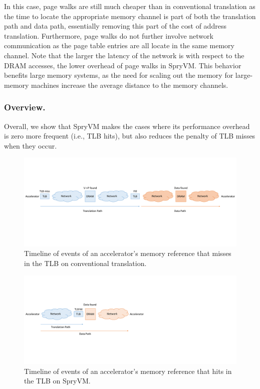 In this case, page walks are still much cheaper than in conventional translation as the time to locate the appropriate memory channel is part of both the translation path and data path, essentially removing this part of the cost of address translation. Furthermore, page walks do not further involve network communication as the page table entries are all locate in the same memory channel. Note that the larger the latency of the network is with respect to the DRAM accesses, the lower overhead of page walks in SpryVM. This behavior benefits large memory systems, as the need for scaling out the memory for large-memory machines increase the average distance to the memory channels. 

\subsubsection{Overview.} Overall, we show that SpryVM makes the cases where its performance overhead is zero more frequent (i.e., TLB hits), but also reduces the penalty of TLB misses when they occur. 

\begin{figure}
	\includegraphics[width=\textwidth]{figures/time_event_base.pdf}
	\caption{Timeline of events of an accelerator's memory reference that misses in the TLB on conventional translation.}
	\label{fig:pagewalk_base}
\end{figure}

\begin{figure}
	\includegraphics[width=\textwidth]{figures/time_event_partition_hit.pdf}
	\caption{Timeline of events of an accelerator's memory reference that hits in the TLB on SpryVM.}
	\label{fig:pagewalk_partition_hit}
\end{figure}


